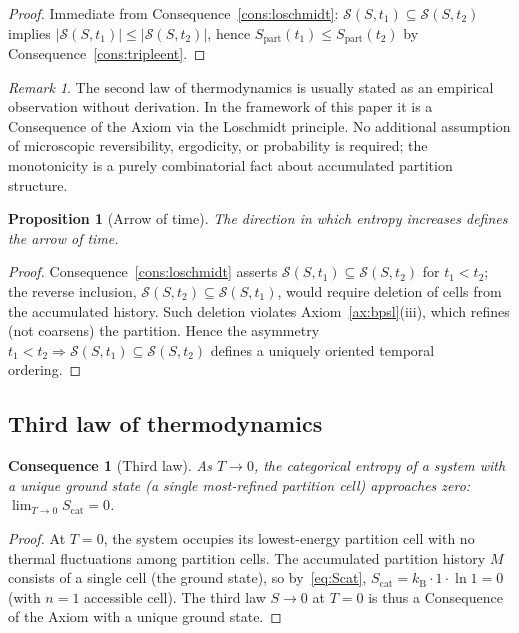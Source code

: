 \documentclass[11pt,twocolumn,a4paper]{article}
\theoremstyle{axiomstyle}
\theoremstyle{conseqstyle}
\newtheorem{consequence}{Consequence}
\newtheorem{proposition}{Proposition}
\theoremstyle{definition}
\theoremstyle{remark}
\newtheorem*{remark}{Remark}
\newcommand{\kB}{k_{\mathrm{B}}}
\newcommand{\Se}{S_{\mathrm{part}}}
\newcommand{\Sspace}{\mathcal{S}}
\begin{document}
\begin{proof}
Immediate from Consequence~\ref{cons:loschmidt}: $\Sspace(S,t_{1})\subseteq\Sspace(S,t_{2})$ implies $|\Sspace(S,t_{1})|\le|\Sspace(S,t_{2})|$, hence $\Se(t_{1})\le\Se(t_{2})$ by Consequence~\ref{cons:tripleent}.
\end{proof}

\begin{remark}
The second law of thermodynamics is usually stated as an empirical observation without derivation. In the framework of this paper it is a Consequence of the Axiom via the Loschmidt principle. No additional assumption of microscopic reversibility, ergodicity, or probability is required; the monotonicity is a purely combinatorial fact about accumulated partition structure.
\end{remark}

\begin{proposition}[Arrow of time]
\label{prop:arrowtime}
The direction in which entropy increases defines the arrow of time.
\end{proposition}

\begin{proof}
Consequence~\ref{cons:loschmidt} asserts $\Sspace(S,t_{1})\subseteq\Sspace(S,t_{2})$ for $t_{1}<t_{2}$; the reverse inclusion, $\Sspace(S,t_{2})\subseteq\Sspace(S,t_{1})$, would require deletion of cells from the accumulated history. Such deletion violates Axiom~\ref{ax:bpsl}(iii), which refines (not coarsens) the partition. Hence the asymmetry $t_{1}<t_{2}\Rightarrow\Sspace(S,t_{1})\subseteq\Sspace(S,t_{2})$ defines a uniquely oriented temporal ordering.
\end{proof}

\subsection{Third law of thermodynamics}

\begin{consequence}[Third law]
\label{cons:thirdlaw}
As $T\to 0$, the categorical entropy of a system with a unique ground state (a single most-refined partition cell) approaches zero: $\lim_{T\to 0}S_{\text{cat}}=0$.
\end{consequence}

\begin{proof}
At $T=0$, the system occupies its lowest-energy partition cell with no thermal fluctuations among partition cells. The accumulated partition history $M$ consists of a single cell (the ground state), so by~\eqref{eq:Scat}, $S_{\text{cat}}=\kB\cdot 1\cdot\ln 1=0$ (with $n=1$ accessible cell). The third law $S\to 0$ at $T=0$ is thus a Consequence of the Axiom with a unique ground state.
\end{proof}
\end{document}
